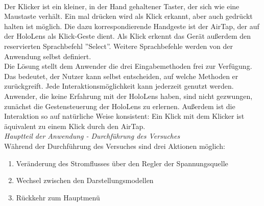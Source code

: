 \vspace{8px}
\begin{center}
	\\
\end{center}
\vspace{6px}

Der Klicker ist ein kleiner, in der Hand gehaltener Taster, der sich wie eine Maustaste verhält. Ein mal drücken wird als Klick erkannt, aber auch gedrückt halten ist möglich.
Die dazu korrespondierende Handgeste ist der AirTap, der auf der HoloLens als Klick-Geste dient. Als Klick erkennt das Gerät außerdem den reservierten Sprachbefehl ''Select''. Weitere Sprachbefehle werden von der Anwendung selbst definiert.\\

Die Lösung stellt dem Anwender die drei Eingabemethoden frei zur Verfügung. Das bedeutet, der Nutzer kann selbst entscheiden, auf welche Methoden er zurückgreift. Jede Interaktionsmöglichkeit kann jederzeit genutzt werden. Anwender, die keine Erfahrung mit der HoloLens haben, sind nicht gezwungen, zunächst die Gestensteuerung der HoloLens zu erlernen. Außerdem ist die Interaktion so auf natürliche Weise konsistent: Ein Klick mit dem Klicker ist äquivalent zu einem Klick durch den AirTap.\\

\textit{Hauptteil der Anwendung - Durchführung des Versuches}\\
Während der Durchführung des Versuches sind drei Aktionen möglich:
\begin{enumerate}[topsep=-2px]
	\setlength{\itemsep}{-5pt}
	\item Veränderung des Stromflusses über den Regler der Spannungsquelle
	\item Wechsel zwischen den Darstellungsmodellen
	\item Rückkehr zum Hauptmenü
\end{enumerate}
\vspace{8px}

